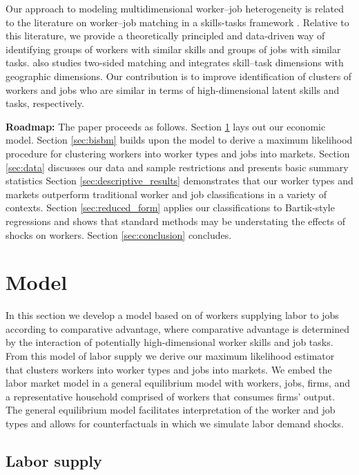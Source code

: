 \documentclass[12pt]{article}
\theoremstyle{definition}
\theoremstyle{plain}
\begin{document}
Our approach to modeling multidimensional worker--job heterogeneity is related to the literature on worker--job matching in a skills-tasks framework \citep{AutorLevyMurnane2003,AcemogluAutor2011,Autor2013,Lindenlaub2017,Tan2018,Kantenga2018}. Relative to this literature, we provide a theoretically principled and data-driven way of identifying groups of workers with similar skills and groups of jobs with similar tasks. \citet{Mansfield2019} also studies two-sided matching and integrates skill--task dimensions with geographic dimensions.  Our contribution is to improve identification of clusters of workers and jobs who are similar in terms of high-dimensional latent skills and tasks, respectively.

\textbf{Roadmap:} The paper proceeds as follows.  Section \ref{sec:model} lays out our economic model. Section \ref{sec:bisbm} builds upon the model to derive a maximum likelihood procedure for clustering workers into worker types and jobs into markets.  Section \ref{sec:data} discusses our data and sample restrictions and presents basic summary statistics Section \ref{sec:descriptive_results} demonstrates that our worker types and markets outperform traditional worker and job classifications in a variety of contexts. Section \ref{sec:reduced_form} applies our classifications to Bartik-style regressions and shows that standard methods may be understating the effects of shocks on workers. Section \ref{sec:conclusion} concludes.




\section{Model}
\label{sec:model}


In this section we develop a model based on \citet{Grigsby2022} of workers supplying labor to jobs according to comparative advantage, where comparative advantage is determined by the interaction of potentially high-dimensional worker skills and job tasks. From this model of labor supply we derive our maximum likelihood estimator that clusters workers into worker types and jobs into markets. We embed the labor market model in a general equilibrium model with workers, jobs, firms, and a representative household comprised of workers that consumes firms' output. The general equilibrium model facilitates interpretation of the worker and job types and allows for counterfactuals in which we simulate labor demand shocks.


\subsection{Labor supply}
\end{document}
